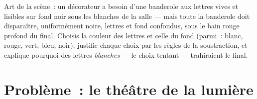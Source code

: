 \begin{exercise}[$\star\star\star$]\label{exo:g8:colors-spectra:12}
Art de la scène~: un décorateur a besoin d'une banderole aux lettres
vives et lisibles sur fond noir sous les  blanches de la
salle --- mais toute la banderole doit disparaître, uniformément
noire, lettres et fond confondus, sous le bain rouge profond du
final. Choisis la couleur des lettres et celle du fond (parmi~:
blanc, rouge, vert, bleu, noir), justifie chaque choix par les règles
de la soustraction, et explique pourquoi des lettres \emph{blanches}
--- le choix tentant --- trahiraient le final.
\end{exercise}

\section{Problème~: le théâtre de la lumière}

